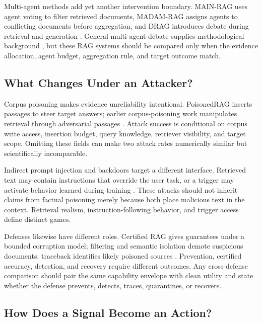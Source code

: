 Multi-agent methods add yet another intervention boundary. MAIN-RAG uses
agent voting to filter retrieved documents, MADAM-RAG assigns agents to
conflicting documents before aggregation, and DRAG introduces debate during
retrieval and generation \citep{mainRAG2025,madamRAG2025,drag2025}. General
multi-agent debate supplies methodological background
\citep{duMultiagentDebate2024}, but these RAG systems should be compared only
when the evidence allocation, agent budget, aggregation rule, and target
outcome match.

\subsection{What Changes Under an Attacker?}

Corpus poisoning makes evidence unreliability intentional. PoisonedRAG inserts
passages to steer target answers; earlier corpus-poisoning work manipulates
retrieval through adversarial passages
\citep{poisonedRAG2024,poisoningRetrievalCorpora2023}. Attack success is
conditional on corpus write access, insertion budget, query knowledge,
retriever visibility, and target scope. Omitting these fields can make two
attack rates numerically similar but scientifically incomparable.

Indirect prompt injection and backdoors target a different interface.
Retrieved text may contain instructions that override the user task, or a
trigger may activate behavior learned during training
\citep{aip2025,phantom2024,trojanRAG2024}. These attacks should not inherit
claims from factual poisoning merely because both place malicious text in the
context. Retrieval realism, instruction-following behavior, and trigger access
define distinct games.

Defenses likewise have different roles. Certified RAG gives guarantees under a
bounded corruption model; filtering and semantic isolation demote suspicious
documents; traceback identifies likely poisoned sources
\citep{certifiedRAG2024,rrag017,rrag128}. Prevention, certified accuracy,
detection, and recovery require different outcomes. Any cross-defense
comparison should pair the same capability envelope with clean utility and
state whether the defense prevents, detects, traces, quarantines, or recovers.

\subsection{How Does a Signal Become an Action?}

